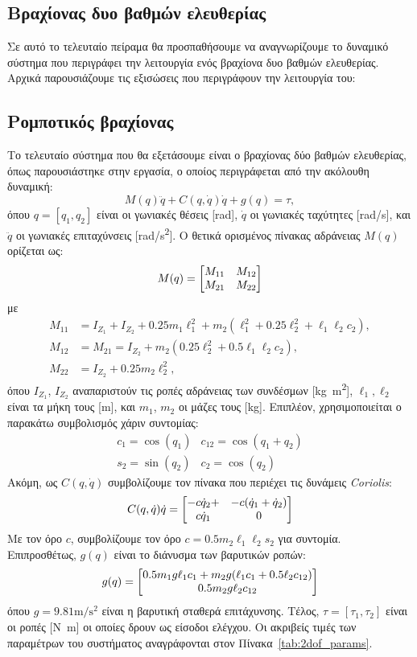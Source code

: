 \subsection{Βραχίονας δυο βαθμών ελευθερίας}
Σε αυτό το τελευταίο πείραμα θα προσπαθήσουμε να αναγνωρίζουμε το δυναμικό σύστημα που περιγράφει την λειτουργία ενός βραχίονα δυο βαθμών ελευθερίας. Αρχικά παρουσιάζουμε τις εξισώσεις που περιγράφουν την λειτουργία του: 

\subsection{Ρομποτικός βραχίονας}
\label{exampleB}
Το τελευταίο σύστημα που θα εξετάσουμε είναι ο βραχίονας δύο βαθμών ελευθερίας, όπως παρουσιάστηκε στην εργασία\cite{bechlioulis2008robust}, ο οποίος περιγράφεται από την ακόλουθη δυναμική:
\[
M(q)\ddot q + C(q,\dot q)\dot q + g(q) = \tau,
\]
όπου $q = [q_1, q_2]$ είναι οι γωνιακές θέσεις [\si{\radian}], $\dot q$ οι γωνιακές ταχύτητες [\si{\radian/\second}], και $\ddot q$ οι γωνιακές επιταχύνσεις  [\si{\radian/\second^2}]. Ο θετικά ορισμένος πίνακας αδράνειας $M(q)$ ορίζεται ως:
\[
M(q) = \bmqty{M_{11} & M_{12}\\ M_{21} & M_{22}}
\]
με
\begin{align*}
M_{11} &= I_{Z_1} + I_{Z_2} + 0.25 m_1 \ell_1^2 
+ m_2(\ell_1^2 + 0.25 \ell_2^2 + \ell_1 \ell_2 c_2),\\
M_{12} &= M_{21} = I_{Z_2} + m_2 (0.25 \ell_2^2 + 0.5 \ell_1 \ell_2 c_2),\\
M_{22} &= I_{Z_2} + 0.25 m_2 \ell_2^2,
\end{align*}
όπου $I_{Z_1}$, $I_{Z_2}$ αναπαριστούν τις ροπές αδράνειας των συνδέσμων [\si{\kilo\gram \metre^2}], $\ell_1, \ell_2$ είναι τα μήκη τους [\si{\metre}], και $m_1$, $m_2$ οι μάζες τους [\si{\kilo\gram}]. Επιπλέον, χρησιμοποιείται ο παρακάτω συμβολισμός χάριν συντομίας:
\[\begin{array}{ll}
c_1 = \cos(q_1) & c_{12} = \cos(q_1 + q_2)\\
s_2 = \sin(q_2) & c_2 = \cos(q_2)
\end{array}\]
Ακόμη, ως $C(q, \dot q)$ συμβολίζουμε τον πίνακα που περιέχει τις δυνάμεις \textit{Coriolis}:
\[
C(q, \dot q)\dot q = \bmqty{-c \dot q_2 +  & -c(\dot q_1 + \dot q_2)\\ c \dot q_1 & 0}
\]
Με τον όρο $c$, συμβολίζουμε τον όρο $c = 0.5 m_2 \ell_1 \ell_2 s_2$ για συντομία. Επιπροσθέτως, $g(q)$ είναι το διάνυσμα των βαρυτικών ροπών:
\[
g(q) = 
\bmqty{0.5 m_1 g \ell_1 c_1 + m_2 g (\ell_1 c_1 + 0.5 \ell_2 c_{12}) \\
	0.5 m_2 g \ell_2 c_{12}}  
\]
όπου $g = 9.81 \si{\metre\per\second^2}$ είναι η βαρυτική σταθερά επιτάχυνσης. Τέλος, $\tau =[\tau_1, \tau_2]$ είναι οι ροπές [\si{\newton\metre}] οι οποίες δρουν ως είσοδοι ελέγχου. Οι ακριβείς τιμές των παραμέτρων του συστήματος αναγράφονται στον Πίνακα~\ref{tab:2dof_params}. 

